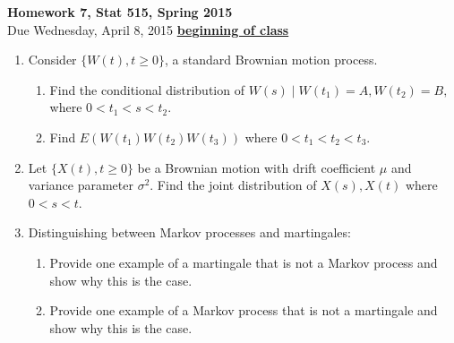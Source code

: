 \documentclass{article}
\begin{document}
\begin{center}
\Large
{\bf Homework 7, Stat 515, Spring 2015}\\
\normalsize
Due Wednesday, April 8, 2015 \underline{{\bf beginning of class}}\\
\end{center}

\begin{enumerate}


\item Consider $\{ W(t), t\geq 0\}$, a standard Brownian motion process. 
\begin{enumerate}
\item Find the conditional distribution of $W(s)\mid W(t_1)=A,
  W(t_2)=B,$ where $0<t_1<s<t_2$.
\item Find $E(W(t_1) W(t_2) W(t_3))$ where $0<t_1<t_2<t_3$.
\end{enumerate}

\item Let $\{X(t), t\geq 0\}$ be a Brownian motion with drift
  coefficient $\mu$ and variance parameter $\sigma^2$.  Find the
  joint distribution of $X(s), X(t)$ where $0<s<t$.


\item Distinguishing between Markov processes and martingales: 
\begin{enumerate}
\item Provide one example of a martingale that is not a Markov process and show why this is the case.
\item Provide one example of a Markov process that is not a martingale and show why this is the case.
\end{enumerate}


\end{enumerate}
\end{document}
